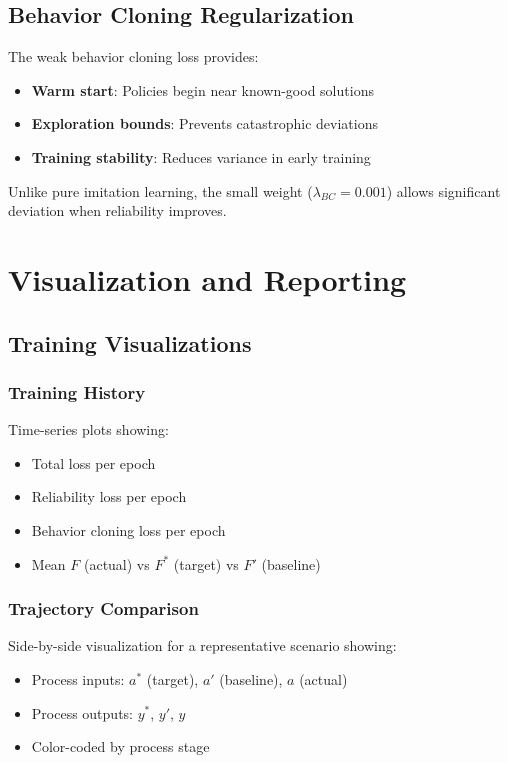 \documentclass[11pt,a4paper]{article}
\begin{document}
\subsection{Behavior Cloning Regularization}

The weak behavior cloning loss provides:

\begin{itemize}
    \item \textbf{Warm start}: Policies begin near known-good solutions
    \item \textbf{Exploration bounds}: Prevents catastrophic deviations
    \item \textbf{Training stability}: Reduces variance in early training
\end{itemize}

Unlike pure imitation learning, the small weight ($\lambda_{BC} = 0.001$) allows significant deviation when reliability improves.

\section{Visualization and Reporting}

\subsection{Training Visualizations}

\subsubsection{Training History}

Time-series plots showing:
\begin{itemize}
    \item Total loss per epoch
    \item Reliability loss per epoch
    \item Behavior cloning loss per epoch
    \item Mean $F$ (actual) vs $F^*$ (target) vs $F'$ (baseline)
\end{itemize}

\subsubsection{Trajectory Comparison}

Side-by-side visualization for a representative scenario showing:
\begin{itemize}
    \item Process inputs: $a^*$ (target), $a'$ (baseline), $a$ (actual)
    \item Process outputs: $y^*$, $y'$, $y$
    \item Color-coded by process stage
\end{itemize}
\end{document}
